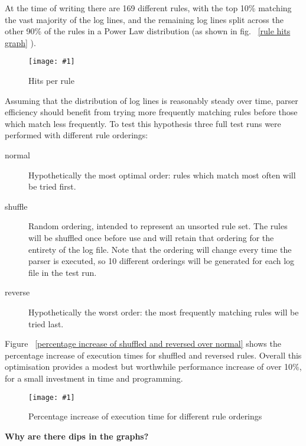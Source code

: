 \documentclass[draft]{svmult}
\newcommand{\showgraph}[3]{%
    \begin{figure}[hbt!]
        \caption{#2}\label{#3}
        \texttt{[image: \#1]}
    \end{figure}
}
\newcommand{\refwithpage}[1]{%
    \empty{}\vref{#1}%
}
\newcommand{\numberOFrules}[0]{%
    169%
}
\begin{document}
\label{Rule ordering}
\label{rule ordering for efficiency}
\label{rule efficiency}

At the time of writing there are \numberOFrules{} different rules, with the
top 10\% matching the vast majority of the log lines, and the remaining log
lines split across the other 90\% of the rules in a Power Law distribution
(as shown in fig.~\refwithpage{rule hits graph}).
\showgraph{build/plot-hits}{Hits per rule}{rule hits graph} Assuming that
the distribution of log lines is reasonably steady over time, parser
efficiency should benefit from trying more frequently matching rules before
those which match less frequently.  To test this hypothesis three full test
runs were performed with different rule orderings:

\begin{description}

    \item [normal]  Hypothetically the most optimal order: rules which
        match most often will be tried first.

    \item [shuffle] Random ordering, intended to represent an unsorted rule
        set.  The rules will be shuffled once before use and will retain
        that ordering for the entirety of the log file.  Note that the
        ordering will change every time the parser is executed, so 10
        different orderings will be generated for each log file in the test
        run.

    \item [reverse] Hypothetically the worst order: the most frequently
        matching rules will be tried last.

\end{description}

Figure~\refwithpage{percentage increase of shuffled and reversed over
normal} shows the percentage increase of execution times for shuffled and
reversed rules.  Overall this optimisation provides a modest but worthwhile
performance increase of over 10\%, for a small investment in time and
programming.
\showgraph{build/plot-normal-shuffle-reverse-factor}{Percentage increase of
execution time for different rule orderings}{percentage increase of
shuffled and reversed over normal}

\noindent\textbf{Why are there dips in the graphs?}

\label{Why are there dips in the graphs?}
\end{document}
